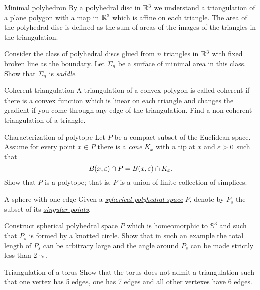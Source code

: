 \documentclass[twoside]{book}
\begin{document}
{\begin{pr}{}{Minimal polyhedron}\label{Minimal polyhedron}
By a polyhedral disc in $\mathbb{R}^3$
we understand a triangulation of a plane polygon with a map in $\mathbb{R}^3$ which is affine on each triangle.
The area of the polyhedral disc is defined as the sum of areas of the images of the triangles in the triangulation.

Consider the  class of polyhedral discs glued from $n$ triangles in $\mathbb{R}^3$ 
with fixed broken line as the boundary.
Let $\Sigma_n$ be a surface of minimal area in this class.
Show that $\Sigma_n$ is  \hyperref[Saddle surface]{\emph{saddle}}.
\end{pr}


\begin{pr}{}{Coherent triangulation}\label{Coherent triangulation} 
A triangulation of a convex polygon is called coherent if there is a convex function which is linear on each triangle and changes the gradient if you come through any edge of the triangulation.
Find a non-coherent triangulation of a triangle.
\end{pr}

\begin{pr}{}{Characterization of polytope}
\label{conic neighborhoods}
Let $P$ be a compact subset of the Euclidean space.
Assume for every point $x\in P$
there is a \emph{cone} $K_x$ with a tip at $x$ and $\varepsilon>0$
such that 
$$B(x,\varepsilon)\cap P
=
B(x,\varepsilon)\cap K_x.$$
Show that $P$ is a polytope; 
that is, $P$ is a union of finite collection of simplices.
\end{pr}

\begin{pr}{\hard}{A sphere with one edge}\label{panov-S^3} 
Given  a \hyperref[Polyhedral space]{\emph{spherical polyhedral space}} $P$,
denote by $P_s$ the subset of its 
\hyperref[Polyhedral space]{\emph{singular points}}.

Construct spherical polyhedral space $P$ which is homeomorphic to $\mathbb{S}^3$ and such that $P_s$ is formed by a knotted circle.
Show that in such an example the total length of $P_s$ can be arbitrary large and the angle around $P_s$ can be made strictly less than $2\cdot\pi$.
\end{pr}

\begin{pr}{}{Triangulation of a torus}\label{Triangulation of a torus}
Show that the torus does not admit a triangulation 
such that one vertex has 5 edges,
one has 7 edges and 
all other vertexes have 
6 edges. 
\end{pr}

}
\end{document}
